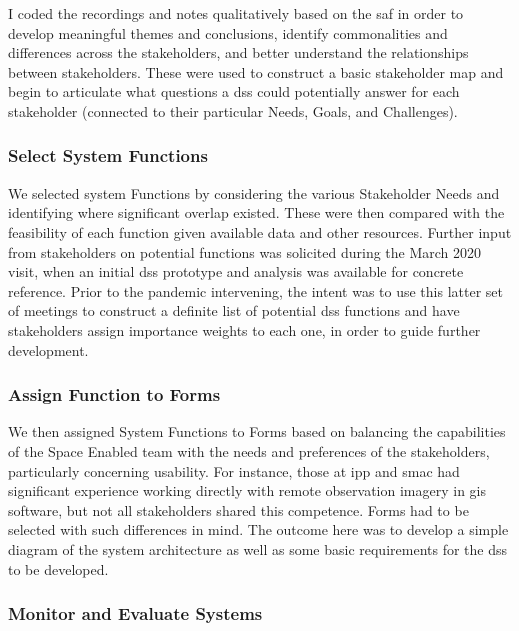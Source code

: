 I coded the recordings and notes qualitatively based on the \ac{saf} in order to develop meaningful themes and conclusions, identify commonalities and differences across the stakeholders, and better understand the relationships between stakeholders. These were used to construct a basic stakeholder map and begin to articulate what questions a \ac{dss} could potentially answer for each stakeholder (connected to their particular Needs, Goals, and Challenges). 

\subsubsection{Select System Functions}

We selected system Functions by considering the various Stakeholder Needs and identifying where significant overlap existed. These were then compared with the feasibility of each function given available data and other resources. Further input from stakeholders on potential functions was solicited during the March 2020 visit, when an initial \ac{dss} prototype and analysis was available for concrete reference. Prior to the pandemic intervening, the intent was to use this latter set of meetings to construct a definite list of potential \ac{dss} functions and have stakeholders assign importance weights to each one, in order to guide further development.

\subsubsection{Assign Function to Forms}

We then assigned System Functions to Forms based on balancing the capabilities of the Space Enabled team with the needs and preferences of the stakeholders, particularly concerning usability. For instance, those at \ac{ipp} and \ac{smac} had significant experience working directly with remote observation imagery in \ac{gis} software, but not all stakeholders shared this competence. Forms had to be selected with such differences in mind. The outcome here was to develop a simple diagram of the system architecture as well as some basic requirements for the \ac{dss} to be developed.


\subsubsection{Monitor and Evaluate Systems} \label{sec:rio-monitor-method}

